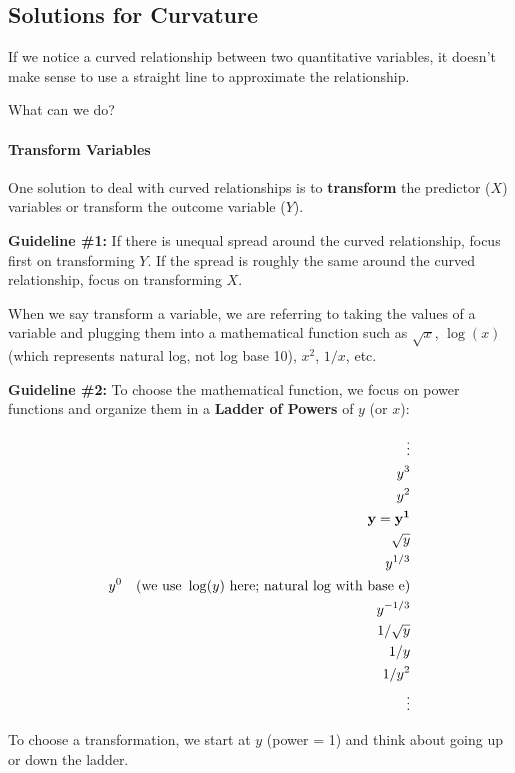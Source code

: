 \documentclass[
]{book}
\begin{document}
\hypertarget{solutions-for-curvature}{%
\subsection{Solutions for Curvature}\label{solutions-for-curvature}}

If we notice a curved relationship between two quantitative variables, it doesn't make sense to use a straight line to approximate the relationship.

What can we do?

\hypertarget{transform-variables}{%
\paragraph{Transform Variables}\label{transform-variables}}

One solution to deal with curved relationships is to \textbf{transform} the predictor (\(X\)) variables or transform the outcome variable (\(Y\)).

\textbf{Guideline \#1:} If there is unequal spread around the curved relationship, focus first on transforming \(Y\). If the spread is roughly the same around the curved relationship, focus on transforming \(X\).

When we say transform a variable, we are referring to taking the values of a variable and plugging them into a mathematical function such as \(\sqrt{x}\), \(\log(x)\) (which represents natural log, not log base 10), \(x^2\), \(1/x\), etc.

\textbf{Guideline \#2:} To choose the mathematical function, we focus on power functions and organize them in a \textbf{Ladder of Powers} of \(y\) (or \(x\)):

\begin{align}
\vdots\\
y^3\\
y^2\\
\mathbf{y = y^1}\\
\sqrt{y}\\
y^{1/3}\\
y^{0} ~~~  (\hbox{we~use}~\log(y)~\hbox{here; natural log with base e)}\\
y^{-1/3}\\
1/\sqrt{y}\\
1/y\\
1/y^2\\
\vdots
\end{align}

To choose a transformation, we start at \(y\) (power = 1) and think about going up or down the ladder.
\end{document}
